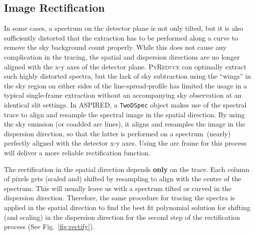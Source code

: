 \documentclass[twocolumn, linenumbers]{aastex631}
\begin{document}
\subsection{Image Rectification}
In some cases, a spectrum on the detector plane is not only tilted,
but it is also sufficiently distorted that the extraction has to be
performed along a curve to remove the sky background count
properly. While this does not cause any complication in the tracing,
the spatial and dispersion directions are no longer aligned with the
x-y axes of the detector plane. \textsc{PyReduce} can optimally
extract such highly distorted spectra, but the lack of sky subtraction
using the ``wings'' in the sky region on either sides of the
line-spread-profile has limited the usage in a typical single-frame
extraction without an accompanying sky observation at an identical slit
settings. In \textsc{ASPIRED}, a \verb+TwoDSpec+ object makes use of
the spectral trace to align and resample the spectral image in the spatial
direction. By using the sky emission (or coadded arc lines), it
aligns and resamples the image in the dispersion direction, so that the
latter is performed on a spectrum~(nearly) perfectly aligned with the
detector x-y axes. Using the arc frame for this process will deliver
a more reliable rectification function.

The rectification in the spatial direction depends \textbf{only}
on the trace. Each column of pixels gets (scaled and) shifted by
resampling to align with the centre of the spectrum. This will
usually leave us with a spectrum tilted or curved in the dispersion
direction. Therefore, the same procedure for tracing the spectra is
applied in the spatial direction to find the best fit polynomial
solution for shifting (and scaling) in the dispersion direction for
the second step of the rectification process (See Fig.~\ref{fig:rectify}).
\end{document}
